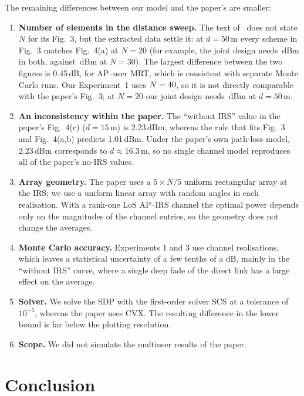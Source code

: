\documentclass[11pt,a4paper]{article}
\begin{document}
The remaining differences between our model and the paper's are smaller:
\begin{enumerate}[leftmargin=1.6em,itemsep=2pt]
\item \textbf{Number of elements in the distance sweep.} The text of~\cite{wu} does not state $N$ for
its Fig.~3, but the extracted data settle it: at $d=50$\,m every scheme in Fig.~3 matches Fig.~4(a) at
$N=20$ (for example, the joint design needs \paperNtwenty\,dBm in both, against \paperNthirty\,dBm at
$N=30$). The largest difference between the two figures is 0.45\,dB, for AP--user MRT, which is
consistent with separate Monte Carlo runs. Our Experiment~1 uses $N=40$, so it is not directly comparable with the paper's Fig.~3; at
$N=20$ our joint design needs \aoNtwenty\,dBm at $d=50$\,m.
\item \textbf{An inconsistency within the paper.} The ``without IRS'' value in the paper's Fig.~4(c)
($d=15$\,m) is 2.23\,dBm, whereas the rule that fits Fig.~3 and Fig.~4(a,b) predicts 1.01\,dBm. Under
the paper's own path-loss model, 2.23\,dBm corresponds to $d\approx16.3$\,m, so no single channel
model reproduces all of the paper's no-IRS values.
\item \textbf{Array geometry.} The paper uses a $5\times N/5$ uniform rectangular array at the IRS; we
use a uniform linear array with random angles in each realisation. With a rank-one LoS AP--IRS
channel the optimal power depends only on the magnitudes of the channel entries, so the geometry does
not change the averages.
\item \textbf{Monte Carlo accuracy.} Experiments 1 and 3 use \nSdr{} channel realisations, which
leaves a statistical uncertainty of a few tenths of a dB, mainly in the ``without IRS'' curve, where a
single deep fade of the direct link has a large effect on the average.
\item \textbf{Solver.} We solve the SDP with the first-order solver SCS at a tolerance of $10^{-5}$,
whereas the paper uses CVX. The resulting difference in the lower bound is far below the plotting
resolution.
\item \textbf{Scope.} We did not simulate the multiuser results of the paper.
\end{enumerate}

\section{Conclusion}
\end{document}
